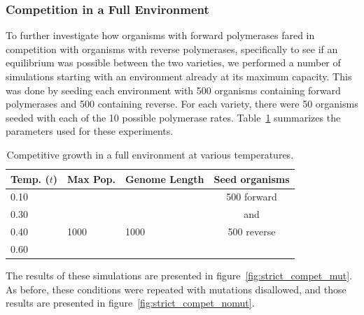 \subsubsection*{Competition in a Full Environment}
To further investigate how organisms with forward polymerases fared in competition with organisms with reverse polymerases, specifically to see if an equilibrium was possible between the two varieties, we performed a number of simulations starting with an environment already at its maximum capacity. This was done by seeding each environment with 500 organisms containing forward polymerases and 500 containing reverse. For each variety, there were 50 organisms seeded with each of the 10 possible polymerase rates. Table~\ref{tab:strict} summarizes the parameters used for these experiments.

\begin{table}
	\begin{center}
		\begin{tabular}[c]{ l | l | l | c }
			Temp. ($t$) & Max Pop. & Genome Length & Seed organisms \\
			\hline
			0.10 & & & 500 forward\\
			0.30 & & & and\\
			0.40 & 1000 & 1000 & 500 reverse\\
			0.60 & & &\\
		\end{tabular}
		\caption{Competitive growth in a full environment at various temperatures.}
		\label{tab:strict}
	\end{center}
\end{table}

The results of these simulations are presented in figure~\ref{fig:strict_compet_mut}. As before, these conditions were repeated with mutations disallowed, and those results are presented in figure~\ref{fig:strict_compet_nomut}.

